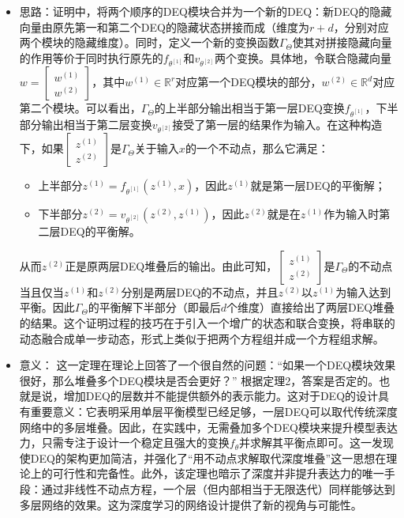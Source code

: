 \documentclass[cn,hazy,cyan,11pt,normal]{elegantnote}
\begin{document}
    \begin{itemize}
        \item 思路：证明中，将两个顺序的DEQ模块合并为一个新的DEQ：新DEQ的隐藏向量由原先第一和第二个DEQ的隐藏状态拼接而成（维度为$r+d$，分别对应两个模块的隐藏维度）。同时，定义一个新的变换函数$\Gamma_{\Theta}$使其对拼接隐藏向量的作用等价于同时执行原先的$f_{\theta^{[1]}}$和$v_{\theta^{[2]}}$两个变换。具体地，令联合隐藏向量$w = \begin{bmatrix}w^{(1)}\\w^{(2)}\end{bmatrix}$，其中$w^{(1)}\in\mathbb{R}^r$对应第一个DEQ模块的部分，$w^{(2)}\in\mathbb{R}^d$对应第二个模块。可以看出，$\Gamma_{\Theta}$的上半部分输出相当于第一层DEQ变换$f_{\theta^{[1]}}$，下半部分输出相当于第二层变换$v_{\theta^{[2]}}$接受了第一层的结果作为输入。在这种构造下，如果$\begin{bmatrix}z^{(1)}\\z^{(2)}\end{bmatrix}$是$\Gamma_{\Theta}$关于输入$x$的一个不动点，那么它满足：
            \begin{itemize}
                \item 上半部分$z^{(1)}=f_{\theta^{[1]}}(z^{(1)},x)$，因此$z^{(1)}$就是第一层DEQ的平衡解；
                \item 下半部分$z^{(2)}=v_{\theta^{[2]}}(z^{(2)},z^{(1)})$，因此$z^{(2)}$就是在$z^{(1)}$作为输入时第二层DEQ的平衡解。
            \end{itemize}
            从而$z^{(2)}$正是原两层DEQ堆叠后的输出。由此可知，$\begin{bmatrix}z^{(1)}\\z^{(2)}\end{bmatrix}$是$\Gamma_{\Theta}$的不动点当且仅当$z^{(1)}$和$z^{(2)}$分别是两层DEQ的不动点，并且$z^{(2)}$以$z^{(1)}$为输入达到平衡。因此$\Gamma_{\Theta}$的平衡解下半部分（即最后$d$个维度）直接给出了两层DEQ堆叠的结果。这个证明过程的技巧在于引入一个增广的状态和联合变换，将串联的动态融合成单一步动态，形式上类似于把两个方程组并成一个方程组求解。
        \item 意义： 这一定理在理论上回答了一个很自然的问题：“如果一个DEQ模块效果很好，那么堆叠多个DEQ模块是否会更好？” 根据定理2，答案是否定的。也就是说，增加DEQ的层数并不能提供额外的表示能力。这对于DEQ的设计具有重要意义：它表明采用单层平衡模型已经足够，一层DEQ可以取代传统深度网络中的多层堆叠。因此，在实践中，无需叠加多个DEQ模块来提升模型表达力，只需专注于设计一个稳定且强大的变换$f_\theta$并求解其平衡点即可。这一发现使DEQ的架构更加简洁，并强化了“用不动点求解取代深度堆叠”这一思想在理论上的可行性和完备性。此外，该定理也暗示了深度并非提升表达力的唯一手段：通过非线性不动点方程，一个层（但内部相当于无限迭代）同样能够达到多层网络的效果。这为深度学习的网络设计提供了新的视角与可能性。

\end{itemize}
\end{document}
